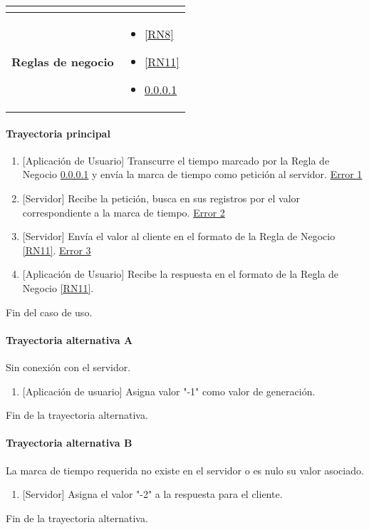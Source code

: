 \begin{longtable}{|J{5cm}|J{10.3cm}|}
\begin{itemize}
		\end{itemize} \\ \hline
	\textbf{Reglas de negocio} & 
		\begin{itemize}
		    \item \ref{RN8}
			\item \ref{RN11}
			\item \ref{}
		\end{itemize} \\ \hline

\end{longtable}

\paragraph{Trayectoria principal}
	\begin{enumerate}
		\item {[Aplicación de Usuario]} Transcurre el tiempo marcado por la Regla de Negocio \ref{} y envía la marca de tiempo como petición al servidor. \hyperref[CU5:Error1]{Error 1}
		\item {[Servidor]} Recibe la petición, busca en sus registros por el valor correspondiente a la marca de tiempo. \hyperref[CU5:Error2]{Error 2} 
		\item  {[Servidor]} Envía el valor al cliente en el formato de la Regla de Negocio \ref{RN11}. \hyperref[CU5:Error3]{Error 3}
        \item {[Aplicación de Usuario]} Recibe la respuesta en el formato de la Regla de Negocio \ref{RN11}.
	\end{enumerate}
	Fin del caso de uso.

\paragraph{Trayectoria alternativa A} \label{SUB-M-CU5:TA}
	Sin conexión con el servidor.
	\begin{enumerate}[label=A\arabic*.]
		\item {[Aplicación de usuario]} Asigna valor "-1" como valor de generación.
	\end{enumerate}
	Fin de la trayectoria alternativa.

\paragraph{Trayectoria alternativa B} \label{SUB-M-CU5:TB}
	La marca de tiempo requerida no existe en el servidor o es nulo su valor asociado.
	\begin{enumerate}[label=B\arabic*.]
		\item {[Servidor]} Asigna el valor "-2" a la respuesta para el cliente.
	\end{enumerate}
	Fin de la trayectoria alternativa.


